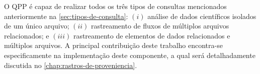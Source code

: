 O QPP é capaz de realizar todos os três tipos de consultas mencionados anteriormente na \autoref{sec:tipos-de-consulta}: \((i)\) análise de dados científicos isolados de um único arquivo; \((ii)\) rastreamento de fluxos de múltiplos arquivos relacionados; e \((iii)\) rastreamento de elementos de dados relacionados e múltiplos arquivos. 
A principal contribuição deste trabalho encontra-se especificamente na implementação deste componente, a qual será detalhadamente discutida no \autoref{chap:rastros-de-proveniencia}.